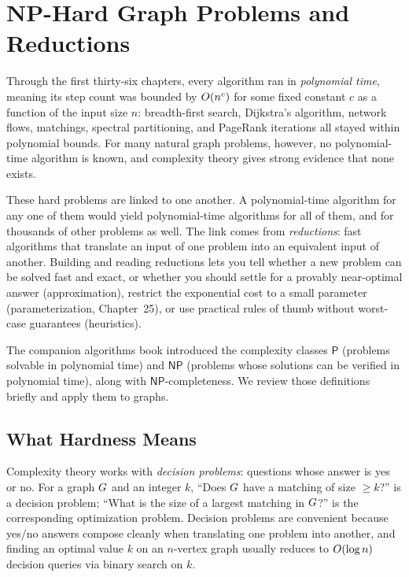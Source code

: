 \chapter{NP-Hard Graph Problems and Reductions}
\label{ch:np-hard}

Through the first thirty-six chapters, every algorithm ran in \emph{polynomial time}, meaning its step count was bounded by $O(n^c)$ for some fixed constant $c$ as a function of the input size $n$: breadth-first search, Dijkstra's algorithm, network flows, matchings, spectral partitioning, and PageRank iterations all stayed within polynomial bounds. For many natural graph problems, however, no polynomial-time algorithm is known, and complexity theory gives strong evidence that none exists.

These hard problems are linked to one another. A polynomial-time algorithm for
any one of them would yield polynomial-time algorithms for all of them, and
for thousands of other problems as well. The link comes from
\emph{reductions}: fast algorithms that translate an input of one problem into an equivalent input of another. Building
and reading reductions lets you tell whether a new problem can be solved fast and exact,
or whether you should settle for a provably near-optimal answer (approximation), restrict the exponential cost to a small parameter (parameterization, Chapter~25), or use practical rules of thumb without worst-case guarantees (heuristics).

The companion algorithms book introduced the complexity classes $\mathsf{P}$ (problems solvable in polynomial time) and $\mathsf{NP}$ (problems whose solutions can be verified in polynomial time), along with $\mathsf{NP}$-completeness. We review those definitions briefly and apply them to graphs.

\chapterline

\section{What Hardness Means}
\label{ch37:meaning}

Complexity theory works with \emph{decision problems}: questions whose answer is yes or no. For a graph $G$ and an integer $k$, ``Does
$G$ have a matching of size $\ge k$?'' is a decision problem; ``What is the
size of a largest matching in $G$?'' is the corresponding optimization problem. Decision problems are convenient
because yes/no answers compose cleanly when translating one problem into another, and
finding an optimal value $k$ on an $n$-vertex graph usually reduces to $O(\log n)$ decision
queries via binary search on $k$.

